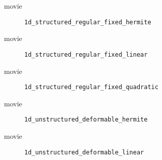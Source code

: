 

%
\begin{frame}{movie}
  \begin{figure}[h!]
    \caption{\lstinline{1d_structured_regular_fixed_hermite}}
  \end{figure} 
\end{frame}



%
\begin{frame}{movie}
  \begin{figure}[h!]
    \caption{\lstinline{1d_structured_regular_fixed_linear}}
  \end{figure} 
\end{frame}



%
\begin{frame}{movie}
  \begin{figure}[h!]
    \caption{\lstinline{1d_structured_regular_fixed_quadratic}}
  \end{figure} 
\end{frame}



%
\begin{frame}{movie}
  \begin{figure}[h!]
    \caption{\lstinline{1d_unstructured_deformable_hermite}}
  \end{figure} 
\end{frame}



%
\begin{frame}{movie}
  \begin{figure}[h!]
    \caption{\lstinline{1d_unstructured_deformable_linear}}
  \end{figure} 
\end{frame}

